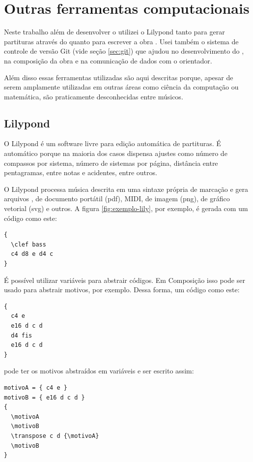 \section{Outras ferramentas computacionais}
\label{sec:outr-ferr-comp}

Neste trabalho além de desenvolver o \goiaba{} utilizei o Lilypond
tanto para gerar partituras através do \goiaba{} quanto para escrever
a obra \obra{}. Usei também o sistema de controle de versão Git (vide
seção \ref{sec:git}) que ajudou no desenvolvimento do \goiaba{}, na
composição da obra e na comunicação de dados com o orientador.

Além disso essas ferramentas utilizadas são aqui descritas porque,
apesar de serem amplamente utilizadas em outras áreas como ciência da
computação ou matemática, são praticamente desconhecidas entre
músicos.

\subsection{Lilypond}
\label{sec:lilypond}

O Lilypond \cite{nienhuys.ea08:lilypond} é um software livre para
edição automática de partituras. É automático porque na maioria dos
casos dispensa ajustes como número de compassos por sistema, número de
sistemas por página, distância entre pentagramas, entre notas e
acidentes, entre outros.

O Lilypond processa música descrita em uma sintaxe própria de marcação
e gera arquivos , de documento portátil (pdf), MIDI,
de imagem (png), de gráfico vetorial (svg) e outros. A figura
\ref{fig:exemplo-lily}, por exemplo, é gerada com um código como este:

\singlespacing
\begin{verbatim}
{
  \clef bass 
  c4 d8 e d4 c 
}
\end{verbatim}
\doublespacing

É possível utilizar variáveis para abstrair códigos. Em Composição
isso pode ser usado para abstrair motivos, por exemplo. Dessa forma,
um código como este:

\singlespacing
\begin{verbatim}
{
  c4 e
  e16 d c d
  d4 fis
  e16 d c d
}
\end{verbatim}
\doublespacing

pode ter os motivos abstraídos em variáveis e ser escrito assim:

\singlespacing
\begin{verbatim}
motivoA = { c4 e }
motivoB = { e16 d c d }
{
  \motivoA
  \motivoB
  \transpose c d {\motivoA}
  \motivoB
}
\end{verbatim}
\doublespacing


